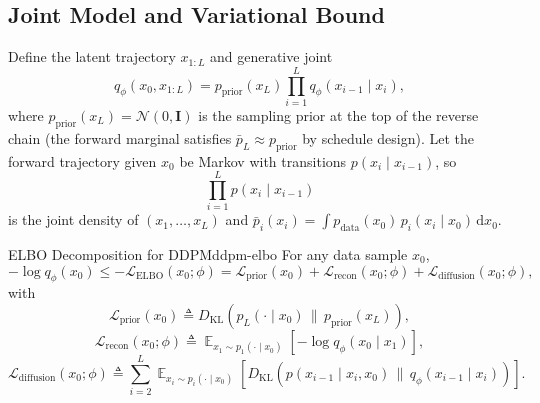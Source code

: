 \documentclass[11pt,a4paper]{article}
\renewcommand{\d}{\mathrm{d}}
\DeclareMathOperator*{\E}{\mathbb{E}}
\newcommand{\cN}{\mathcal{N}}
\newcommand{\KL}[2]{D_{\mathrm{KL}}\!\left(#1\,\|\,#2\right)}
\newcommand{\pdata}{p_{\mathrm{data}}}
\newcommand{\pprior}{p_{\mathrm{prior}}}
\newcommand{\Ldiff}{\mathcal{L}_{\text{diffusion}}}
\newcommand{\Lprior}{\mathcal{L}_{\text{prior}}}
\newcommand{\Lrecon}{\mathcal{L}_{\text{recon}}}
\newcommand{\LELBO}{\mathcal{L}_{\text{ELBO}}}
\newcommand{\bpMarg}[1]{\bar p_{#1}}
\begin{document}
\subsection{Joint Model and Variational Bound}

Define the latent trajectory $x_{1:L}$ and generative joint
\[
q_\phi(x_0,x_{1:L})
=\pprior(x_L)\prod_{i=1}^{L}q_\phi(x_{i-1}\mid x_i),
\]
where $\pprior(x_L)=\cN(0,\mathbf{I})$ is the sampling prior at the top of the reverse chain (the forward marginal satisfies $\bpMarg{L}\approx\pprior$ by schedule design).
Let the forward trajectory given $x_0$ be Markov with transitions $p(x_i\mid x_{i-1})$, so
\[
\prod_{i=1}^{L}p(x_i\mid x_{i-1})
\]
is the joint density of $(x_1,\dots,x_L)$ and $\bpMarg{i}(x_i)=\int \pdata(x_0)\,p_i(x_i\mid x_0)\,\d x_0$.

\begin{theorem}{ELBO Decomposition for DDPM}{ddpm-elbo}
For any data sample $x_0$,
\[
-\log q_\phi(x_0)
\le -\LELBO(x_0;\phi)
=\Lprior(x_0)+\Lrecon(x_0;\phi)+\Ldiff(x_0;\phi),
\]
with
\[
\Lprior(x_0)
\triangleq \KL{p_L(\cdot\mid x_0)}{\pprior(x_L)},
\]
\[
\Lrecon(x_0;\phi)
\triangleq \E_{x_1\sim p_1(\cdot\mid x_0)}\!\left[-\log q_\phi(x_0\mid x_1)\right],
\]
\[
\Ldiff(x_0;\phi)
\triangleq \sum_{i=2}^{L}
\E_{x_i\sim p_i(\cdot\mid x_0)}
\!\left[
\KL{p(x_{i-1}\mid x_i,x_0)}{q_\phi(x_{i-1}\mid x_i)}
\right].
\]
\end{theorem}
\end{document}
